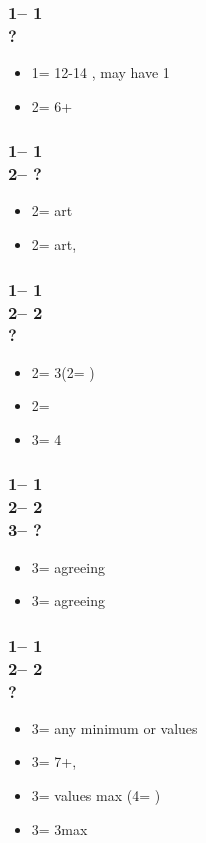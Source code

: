 \documentclass[12pt, a4paper]{article}
\begin{document}
\subsubsection*{1\diams -- 1\spades\\ ?}
\begin{itemize}
    \item 1\nt = 12-14 \bal, may have 1\spades
    \item 2\diams = 6+\diams
\end{itemize}

\subsubsection*{1\diams -- 1\spades\\
                2\diams -- ?}
\begin{itemize}
    \item 2\hearts = \gf art \vimp
    \item 2\nt = \inv art, \fton{3\diams}
\end{itemize}

\subsubsection*{1\diams -- 1\spades\\
                2\diams -- 2\hearts \\ ?}
\begin{itemize}
    \item 2\spades = 3\spades (2\nt = \lsf)
    \item 2\nt = \nat
    \item 3\clubs = 4\hearts \vimp
\end{itemize}

\subsubsection*{1\diams -- 1\spades\\
                2\diams -- 2\hearts \\
                3\clubs -- ?}
\begin{itemize}
    \item 3\diams = agreeing \diams
    \item 3\hearts = agreeing \hearts
\end{itemize}

\subsubsection*{1\diams -- 1\spades\\
                2\diams -- 2\nt \\ ?}
\begin{itemize}
    \item 3\clubs = any minimum or \clubs values
    \item 3\diams = 7+\diams, \gf
    \item 3\hearts = \hearts values max (4\diams = \nf)
    \item 3\spades = 3\spades max
\end{itemize}
\end{document}
